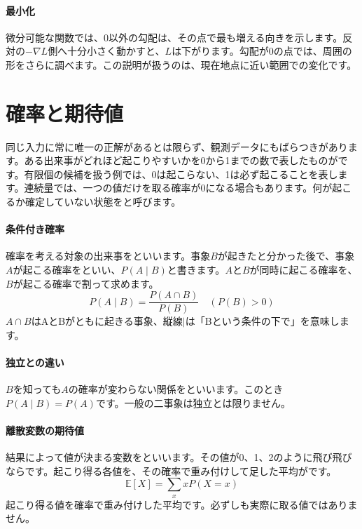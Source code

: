 \paragraph{最小化}
        微分可能な関数では、0以外の勾配は、その点で最も増える向きを示します。反対の$-\nabla L$側へ十分小さく動かすと、$L$は下がります。勾配が0の点では、周囲の形をさらに調べます。この説明が扱うのは、現在地点に近い範囲での変化です。

\par
\endgroup
\par
\endgroup


\section{確率と期待値}
\label{sec:06-machine-learning-03}

同じ入力に常に唯一の正解があるとは限らず、観測データにもばらつきがあります。ある出来事がどれほど起こりやすいかを0から1までの数で表したものがです。有限個の候補を扱う例では、0は起こらない、1は必ず起こることを表します。連続量では、一つの値だけを取る確率が0になる場合もあります。何が起こるか確定していない状態をと呼びます。

\begingroup
\begingroup
\paragraph{条件付き確率}
        確率を考える対象の出来事をといいます。事象$B$が起きたと分かった後で、事象$A$が起こる確率をといい、$P(A\mid B)$と書きます。$A$と$B$が同時に起こる確率を、$B$が起こる確率で割って求めます。
        \[
          P(A\mid B)=\frac{P(A\cap B)}{P(B)}
          \quad (P(B)>0)
        \]
        $A\cap B$はAとBがともに起きる事象、縦線$\mid$は「Bという条件の下で」を意味します。

\paragraph{独立との違い}
        $B$を知っても$A$の確率が変わらない関係をといいます。このとき$P(A\mid B)=P(A)$です。一般の二事象は独立とは限りません。

\par
\endgroup
\medskip
\begingroup
\paragraph{離散変数の期待値}
        結果によって値が決まる変数をといいます。その値が0、1、2のように飛び飛びならです。起こり得る各値を、その確率で重み付けして足した平均がです。
        \[
          \mathbb{E}[X]=\sum_x xP(X=x)
        \]
        起こり得る値を確率で重み付けした平均です。必ずしも実際に取る値ではありません。

